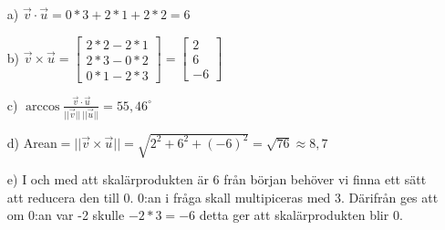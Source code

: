 \begin{itemize}
\item[a) ] $\vec{v}\cdot\vec{u}=0*3+2*1+2*2=6$
\item[b) ] $\vec{v}\times\vec{u}=\begin{bmatrix}2*2-2*1\\2*3-0*2\\0*1-2*3\end{bmatrix}=\begin{bmatrix}2\\6\\-6\end{bmatrix}$
\item[c) ] $\arccos{}\frac{\vec{v}\cdot\vec{u}}{||\vec{v}||\ ||\vec{u}||}=55,46^{\circ}$
\item[d) ] Arean$=||\vec{v}\times\vec{u}||=\sqrt{2^2 + 6^2 + (-6)^2}=\sqrt{76}\approx 8,7$
\item[e) ] I och med att skalärprodukten är 6 från början behöver vi finna ett sätt att reducera den till 0. 0:an i fråga skall multipiceras med 3. Därifrån ges att om 0:an var -2 skulle $-2*3=-6$ detta ger att skalärprodukten blir 0.
\end{itemize}